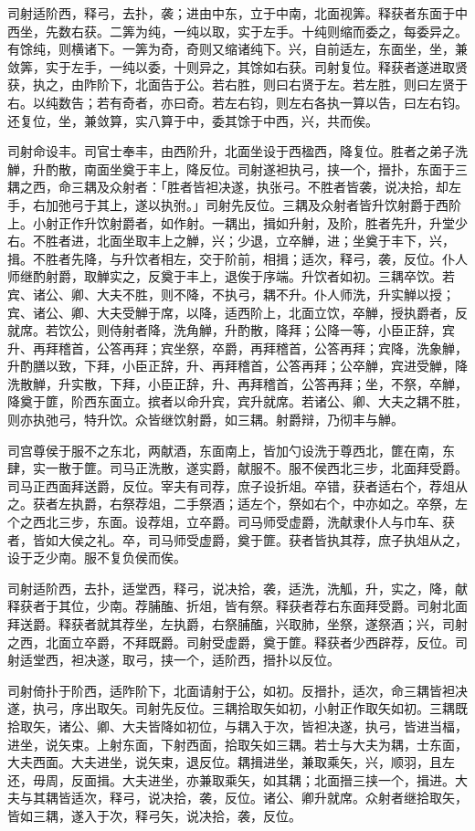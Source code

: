 \documentclass[]{article}
\begin{document}
司射适阶西，释弓，去扑，袭；进由中东，立于中南，北面视筭。释获者东面于中西坐，先数右获。二筭为纯，一纯以取，实于左手。十纯则缩而委之，每委异之。有馀纯，则横诸下。一筭为奇，奇则又缩诸纯下。兴，自前适左，东面坐，坐，兼敛筭，实于左手，一纯以委，十则异之，其馀如右获。司射复位。释获者遂进取贤获，执之，由阼阶下，北面告于公。若右胜，则曰右贤于左。若左胜，则曰左贤于右。以纯数告；若有奇者，亦曰奇。若左右钧，则左右各执一算以告，曰左右钧。还复位，坐，兼敛算，实八算于中，委其馀于中西，兴，共而俟。

司射命设丰。司官士奉丰，由西阶升，北面坐设于西楹西，降复位。胜者之弟子洗觯，升酌散，南面坐奠于丰上，降反位。司射遂袒执弓，挟一个，搢扑，东面于三耦之西，命三耦及众射者：「胜者皆袒决遂，执张弓。不胜者皆袭，说决拾，却左手，右加弛弓于其上，遂以执弣。」司射先反位。三耦及众射者皆升饮射爵于西阶上。小射正作升饮射爵者，如作射。一耦出，揖如升射，及阶，胜者先升，升堂少右。不胜者进，北面坐取丰上之觯，兴；少退，立卒觯，进；坐奠于丰下，兴，揖。不胜者先降，与升饮者相左，交于阶前，相揖；适次，释弓，袭，反位。仆人师继酌射爵，取觯实之，反奠于丰上，退俟于序端。升饮者如初。三耦卒饮。若宾、诸公、卿、大夫不胜，则不降，不执弓，耦不升。仆人师洗，升实觯以授；宾、诸公、卿、大夫受觯于席，以降，适西阶上，北面立饮，卒觯，授执爵者，反就席。若饮公，则侍射者降，洗角觯，升酌散，降拜；公降一等，小臣正辞，宾升、再拜稽首，公答再拜；宾坐祭，卒爵，再拜稽首，公答再拜；宾降，洗象觯，升酌膳以致，下拜，小臣正辞，升、再拜稽首，公答再拜；公卒觯，宾进受觯，降洗散觯，升实散，下拜，小臣正辞，升、再拜稽首，公答再拜；坐，不祭，卒觯，降奠于篚，阶西东面立。摈者以命升宾，宾升就席。若诸公、卿、大夫之耦不胜，则亦执弛弓，特升饮。众皆继饮射爵，如三耦。射爵辩，乃彻丰与觯。

司宫尊侯于服不之东北，两献酒，东面南上，皆加勺设洗于尊西北，篚在南，东肆，实一散于篚。司马正洗散，遂实爵，献服不。服不侯西北三步，北面拜受爵。司马正西面拜送爵，反位。宰夫有司荐，庶子设折俎。卒错，获者适右个，荐俎从之。获者左执爵，右祭荐俎，二手祭酒；适左个，祭如右个，中亦如之。卒祭，左个之西北三步，东面。设荐俎，立卒爵。司马师受虚爵，洗献隶仆人与巾车、获者，皆如大侯之礼。卒，司马师受虚爵，奠于篚。获者皆执其荐，庶子执俎从之，设于乏少南。服不复负侯而俟。

司射适阶西，去扑，适堂西，释弓，说决拾，袭，适洗，洗觚，升，实之，降，献释获者于其位，少南。荐脯醢、折俎，皆有祭。释获者荐右东面拜受爵。司射北面拜送爵。释获者就其荐坐，左执爵，右祭脯醢，兴取肺，坐祭，遂祭酒；兴，司射之西，北面立卒爵，不拜既爵。司射受虚爵，奠于篚。释获者少西辟荐，反位。司射适堂西，袒决遂，取弓，挟一个，适阶西，搢扑以反位。

司射倚扑于阶西，适阼阶下，北面请射于公，如初。反搢扑，适次，命三耦皆袒决遂，执弓，序出取矢。司射先反位。三耦拾取矢如初，小射正作取矢如初。三耦既拾取矢，诸公、卿、大夫皆降如初位，与耦入于次，皆袒决遂，执弓，皆进当楅，进坐，说矢束。上射东面，下射西面，拾取矢如三耦。若士与大夫为耦，士东面，大夫西面。大夫进坐，说矢束，退反位。耦揖进坐，兼取乘矢，兴，顺羽，且左还，毋周，反面揖。大夫进坐，亦兼取乘矢，如其耦；北面搢三挟一个，揖进。大夫与其耦皆适次，释弓，说决拾，袭，反位。诸公、卿升就席。众射者继拾取矢，皆如三耦，遂入于次，释弓矢，说决拾，袭，反位。
\end{document}
